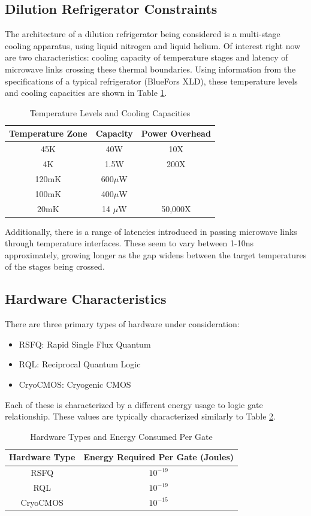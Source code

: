 \subsection{Dilution Refrigerator Constraints}

The architecture of a dilution refrigerator being considered is a multi-stage cooling apparatus, using liquid nitrogen and liquid helium. Of interest right now are two characteristics: cooling capacity of temperature stages and latency of microwave links crossing these thermal boundaries. Using information from the specifications of a typical refrigerator (BlueFors XLD), these temperature levels and cooling capacities are shown in Table \ref{t1}.

\begin{table}[h]
	\centering
    \begin{tabular}{|c|c|c|}
    \hline
    Temperature Zone& Capacity & Power Overhead \\\hline
	45K & 40W & 10X\\
	4K & 1.5W & 200X\\
	120mK & 600$\mu$W&\\
	100mK & 400$\mu$W&\\
	20mK & 14 $\mu$W & 50,000X\\
    \hline
    \end{tabular}
    \caption{Temperature Levels and Cooling Capacities}\label{t1}
\end{table}

Additionally, there is a range of latencies introduced in passing microwave links through temperature interfaces. These seem to vary between 1-10ns approximately, growing longer as the gap widens between the target temperatures of the stages being crossed.

\subsection{Hardware Characteristics}

There are three primary types of hardware under consideration:
\begin{itemize}
	\item RSFQ: Rapid Single Flux Quantum
	\item RQL: Reciprocal Quantum Logic
	\item CryoCMOS: Cryogenic CMOS
\end{itemize}
Each of these is characterized by a different energy usage to logic gate relationship. These values are typically characterized similarly to Table \ref{t2}.
\begin{table}[h]
	\centering
	\begin{tabular}{|c|c|}
	\hline
	Hardware Type & Energy Required Per Gate (Joules) \\ \hline
	RSFQ & $10^{-19}$ \\ \hline
	RQL & $10^{-19}$ \\ \hline
	CryoCMOS & $10^{-15}$ \\
	\hline
	\end{tabular}
	\caption{Hardware Types and Energy Consumed Per Gate}\label{t2}
\end{table}

